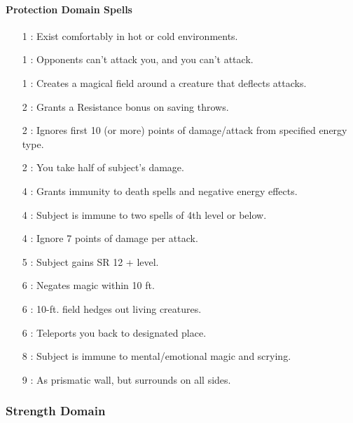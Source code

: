 \paragraph{Protection Domain Spells}
\begin{itemize}
\item[1] : Exist comfortably in hot or cold environments.
\item[1] : Opponents can't attack you, and you can't attack.
\item[1] : Creates a magical field around a creature that deflects attacks.
\item[2] : Grants a Resistance bonus on saving throws.
\item[2] : Ignores first 10 (or more) points of damage/attack from specified energy type.
\item[2] : You take half of subject's damage.
\item[4] : Grants immunity to death spells and negative energy effects.
\item[4] : Subject is immune to two spells of 4th level or below.
\item[4] : Ignore 7 points of damage per attack.
\item[5] : Subject gains SR 12 + level.
\item[6] : Negates magic within 10 ft.
\item[6] : 10-ft. field hedges out living creatures.
\item[6] : Teleports you back to designated place.
\item[8] : Subject is immune to mental/emotional magic and scrying.
\item[9] : As prismatic wall, but surrounds on all sides.
\end{itemize}
\subsubsection{Strength Domain}
